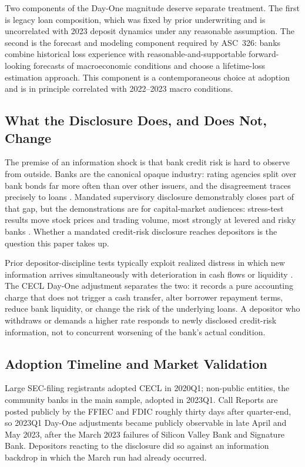 Two components of the Day-One magnitude deserve separate treatment.
The first is legacy loan composition, which was fixed by prior
underwriting and is uncorrelated with 2023 deposit dynamics under any
reasonable assumption.  The second is the forecast and modeling
component required by ASC~326: banks combine historical loss experience
with reasonable-and-supportable forward-looking forecasts of
macroeconomic conditions and choose a lifetime-loss estimation
approach.  This component is a contemporaneous choice at adoption and
is in principle correlated with 2022--2023 macro conditions.

\subsection{What the Disclosure Does, and Does Not, Change}
\label{sec:background:mechanism}

The premise of an information shock is that bank credit risk is hard
to observe from outside.  Banks are the canonical opaque industry:
rating agencies split over bank bonds far more often than over other
issuers, and the disagreement traces precisely to loans
\citep{morgan2002rating}.  Mandated supervisory disclosure
demonstrably closes part of that gap, but the demonstrations are for
capital-market audiences: stress-test results move stock prices and
trading volume, most strongly at levered and risky banks
\citep{flannery2017stress}.  Whether a mandated credit-risk disclosure
reaches depositors is the question this paper takes up.

Prior depositor-discipline tests typically exploit realized distress in
which new information arrives simultaneously with deterioration in cash
flows or liquidity \citep{martinez2001depositors, iyer2016tale}.  The CECL Day-One adjustment separates the two: it
records a pure accounting charge that does not trigger a cash transfer,
alter borrower repayment terms, reduce bank liquidity, or change the
risk of the underlying loans.  A depositor who withdraws or demands a
higher rate responds to newly disclosed credit-risk information, not to
concurrent worsening of the bank's actual condition.

\subsection{Adoption Timeline and Market Validation}
\label{sec:background:timeline}

Large SEC-filing registrants adopted CECL in 2020Q1; non-public
entities, the community banks in the main sample, adopted in 2023Q1.
Call Reports are posted publicly by the FFIEC and FDIC roughly thirty
days after quarter-end, so 2023Q1 Day-One adjustments became publicly
observable in late April and May 2023, after the March 2023 failures of
Silicon Valley Bank and Signature Bank.  Depositors reacting to the
disclosure did so against an information backdrop in which the March run
had already occurred.

